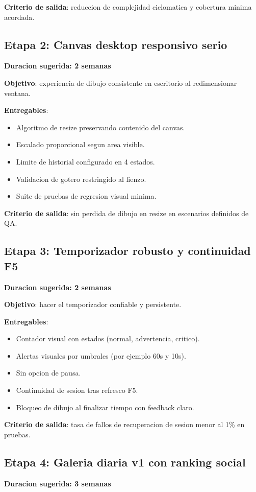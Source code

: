 \documentclass[12pt,a4paper]{article}
\begin{document}
\textbf{Criterio de salida}: reduccion de complejidad ciclomatica y cobertura minima acordada.

\subsection{Etapa 2: Canvas desktop responsivo serio}
\textbf{Duracion sugerida: 2 semanas}

\textbf{Objetivo}: experiencia de dibujo consistente en escritorio al redimensionar ventana.

\textbf{Entregables}:
\begin{itemize}
  \item Algoritmo de resize preservando contenido del canvas.
  \item Escalado proporcional segun area visible.
  \item Limite de historial configurado en 4 estados.
  \item Validacion de gotero restringido al lienzo.
  \item Suite de pruebas de regresion visual minima.
\end{itemize}

\textbf{Criterio de salida}: sin perdida de dibujo en resize en escenarios definidos de QA.

\subsection{Etapa 3: Temporizador robusto y continuidad F5}
\textbf{Duracion sugerida: 2 semanas}

\textbf{Objetivo}: hacer el temporizador confiable y persistente.

\textbf{Entregables}:
\begin{itemize}
  \item Contador visual con estados (normal, advertencia, critico).
  \item Alertas visuales por umbrales (por ejemplo 60s y 10s).
  \item Sin opcion de pausa.
  \item Continuidad de sesion tras refresco F5.
  \item Bloqueo de dibujo al finalizar tiempo con feedback claro.
\end{itemize}

\textbf{Criterio de salida}: tasa de fallos de recuperacion de sesion menor al 1\% en pruebas.

\subsection{Etapa 4: Galeria diaria v1 con ranking social}
\textbf{Duracion sugerida: 3 semanas}
\end{document}
